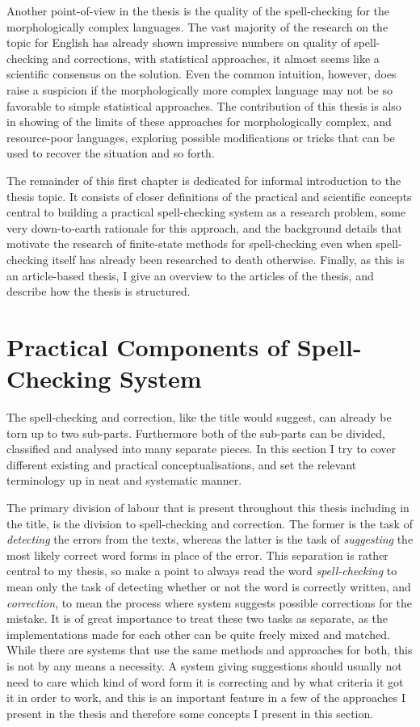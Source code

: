 \documentclass[officiallayout,draft]{unihelcompling}
\begin{document}
Another point-of-view in the thesis is the quality of the spell-checking for
the morphologically complex languages. The vast majority of the research on the
topic for English has already shown impressive numbers on quality of
spell-checking and corrections, with statistical approaches, it almost seems
like a scientific consensus on the solution. Even the common intuition,
however, does raise a suspicion if the morphologically more complex language
may not be so favorable to simple statistical approaches. The contribution of
this thesis is also in showing of the limits of these approaches for
morphologically complex, and resource-poor languages, exploring possible
modifications or tricks that can be used to recover the situation and so forth.

The remainder of this first chapter is dedicated for informal introduction to
the thesis topic. It consists of closer definitions of the practical and
scientific concepts central to building a practical spell-checking system as a
research problem, some very down-to-earth rationale for this approach, and the
background details that motivate the research of finite-state methods for
spell-checking even when spell-checking itself has already been researched to
death otherwise. Finally, as this is an article-based thesis, I give an
overview to the articles of the thesis, and describe how the thesis is
structured.

\section{Practical Components of Spell-Checking System}
\label{sec:practical-components}

The spell-checking and correction, like the title would suggest, can already be
torn up to two sub-parts. Furthermore both of the sub-parts can be divided,
classified and analysed into many separate pieces. In this section I try to
cover different existing and practical conceptualisations, and set the relevant
terminology up in neat and systematic manner.

The primary division of labour that is present throughout this thesis including
in the title, is the division to spell-checking and correction. The former is
the task of \emph{detecting} the errors from the texts, whereas the latter is
the task of \emph{suggesting} the most likely correct word forms in place of
the error. This separation is rather central to my thesis, so make a point to
always read the word \emph{spell-checking} to mean only the task of detecting
whether or not the word is correctly written, and \emph{correction}, to mean
the process where system suggests possible corrections for the mistake.  It is
of great importance to treat these two tasks as separate, as the
implementations made for each other can be quite freely mixed and matched.
While there are systems that use the same methods and approaches for both, this
is not by any means a necessity. A system giving suggestions should usually not
need to care which kind of word form it is correcting and by what criteria it
got it in order to work, and this is an important feature in a few of the
approaches I present in the thesis and therefore some concepts I present in
this section.
\end{document}

